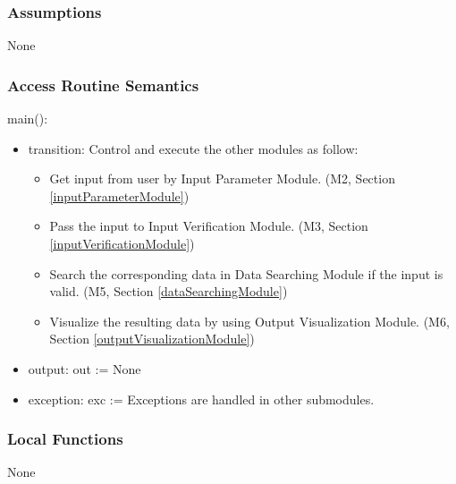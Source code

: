 \documentclass[12pt, titlepage]{article}
\begin{document}
\subsubsection{Assumptions}

None

\subsubsection{Access Routine Semantics}

\noindent main():
\begin{itemize}
\item transition: Control and execute the other modules as follow:
\begin{itemize}
\item Get input from user by Input Parameter Module. (M2, Section \ref{inputParameterModule}) 
\item Pass the input to Input Verification Module. (M3, Section \ref{inputVerificationModule})
\item Search the corresponding data in Data Searching Module if the input is valid. (M5, Section \ref{dataSearchingModule})
\item Visualize the resulting data by using Output Visualization Module. (M6, Section \ref{outputVisualizationModule})

\end{itemize}
\item output: out := None
\item exception: exc := Exceptions are handled in other submodules.
\end{itemize}



\subsubsection{Local Functions}
None
  
\end{document}
